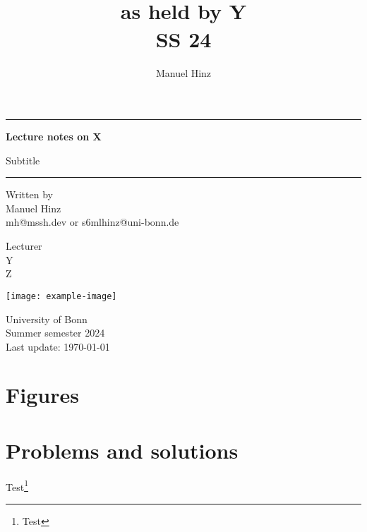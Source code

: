 \documentclass[a4paper, 10pt, oneside]{book}
\author{Manuel Hinz}
\title{\\\small{as held by Y}\\\small{SS 24}}
\date{}
\begin{document}
\pagecolor{mycolor}
\begin{titlepage}
    \centering

    \vspace*{1cm}

    \rule{\textwidth}{1pt}

    \vspace{.7\baselineskip}
    {\huge \textbf{Lecture notes on X}}

    \vspace*{.5cm}
    {\LARGE Subtitle}
    
    \rule{\textwidth}{1pt}

    \vspace{1cm}

    \large

    \begin{minipage}{.5\textwidth}
        \centering
        Written by \\
        Manuel Hinz\\
        {\normalsize mh@mssh.dev or s6mlhinz@uni-bonn.de}
    \end{minipage}%
    \begin{minipage}{.5\textwidth}
        \centering
        Lecturer\\
        Y  \\
        {\normalsize Z}
    \end{minipage}


    \vspace{3cm}

    \texttt{[image: example-image]}

    \vfill

    University of Bonn \\
    Summer semester 2024\\
    Last update: \today
   
\end{titlepage}
\pagecolor{white}
\tableofcontents

\restoregeometry
\chapter{Figures}

\chapter{Problems and solutions}

\newpage 
Test\footnote{Test}
\end{document}
